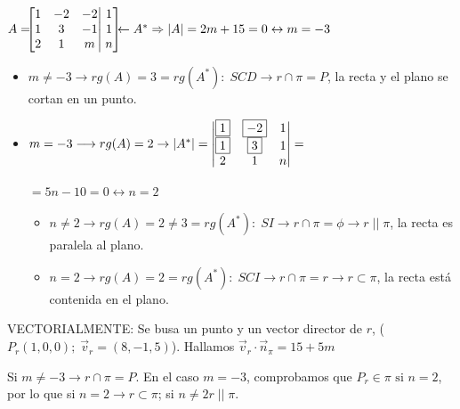 \begin{proofw}\renewcommand{\qedsymbol}{$\diamond$}	
	
\noindent $A=\hspace{-2mm}\left[\begin{matrix} 1&-2&-2\\1&3&-1\\2&1&m\end{matrix}\right| \left. \begin{matrix} 1\\1\\n \end{matrix}\right]\hspace{-2mm} \leftarrow A^* \Rightarrow |A|=2m+15=0 \leftrightarrow m=-3$

\begin{itemize}
\item $m\neq -3 \longrightarrow rg(A)=3=rg(A^*):\; SCD \to r\cap \pi=P$, la recta y el plano se cortan en un punto.
\item $m=-3 \longrightarrow rg(A)=2 \to |A^*|=	\abs{\begin{matrix} \boxed{1}&\boxed{-2}&1\\\boxed{1}&\boxed{3}&1\\2&1&n\end{matrix}}=$

	$=5n-10=0 \leftrightarrow n=2$
	\begin{itemize}
	\item $n\neq 2 \to rg(A)=\boxed{2}\neq 3=rg(A^*):\; SI \to r\cap \pi = \phi \to r\;||\; \pi$, la recta es paralela al plano.
	\item $n=2 \to rg(A)=\boxed{2}=rg(A^*):\; SCI \to r\cap \pi = \boxed{r} \to r \subset \pi$, la recta está contenida en el plano.
	\end{itemize}
\end{itemize}
\noindent \textcolor{gris}{VECTORIALMENTE: Se busa un punto y un vector director de $r$, ($P_r(1,0,0);\; \vec v_r=(8,-1,5)$). Hallamos $\vec v_r \cdot \vec n_{\pi}=15+5m$}

\noindent \textcolor{gris}{Si $m\neq -3 \to r\cap \pi =P$. En el caso $m=-3$, comprobamos que $P_r \in \pi \text{ si } n=2$, por lo que si $n=2 \to r\subset \pi$; si $n\neq 2 r\;||\; \pi$.}

\end{proofw}


